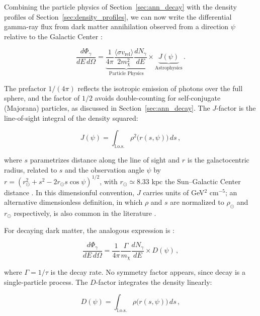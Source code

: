 Combining the particle physics of Section~\ref{sec:ann_decay} with the density profiles of Section~\ref{sec:density_profiles}, we can now write the differential gamma-ray flux from dark matter annihilation observed from a direction $\psi$ relative to the Galactic Center \cite{Cirelli:2024ssz,Hooper:2024}:

\begin{equation}
	\frac{d\Phi_\gamma}{dE\, d\Omega} = \underbrace{\frac{1}{4\pi} \frac{\langle \sigma v_\text{rel} \rangle}{2 m_\chi^2} \frac{dN_\gamma}{dE}}_{\text{Particle Physics}} \times \underbrace{J(\psi)}_{\text{Astrophysics}} \,.
	\label{eq:flux_ann}
\end{equation}

The prefactor $1/(4\pi)$ reflects the isotropic emission of photons over the full sphere, and the factor of $1/2$ avoids double-counting for self-conjugate (Majorana) particles, as discussed in Section~\ref{sec:ann_decay}.
The $J$-factor is the line-of-sight integral of the density squared:

\begin{equation}
	J(\psi) = \int_\text{l.o.s.} \rho^2\bigl(r(s, \psi)\bigr) \, ds \,,
	\label{eq:jfactor}
\end{equation}

where $s$ parametrizes distance along the line of sight and $r$ is the galactocentric radius, related to $s$ and the observation angle $\psi$ by $r = (r_\odot^2 + s^2 - 2 r_\odot s \cos\psi)^{1/2}$, with $r_\odot \simeq 8.33$ kpc the Sun--Galactic Center distance \cite{Cirelli:2024ssz}.
In this dimensionful convention, $J$ carries units of GeV$^2$ cm$^{-5}$; an alternative dimensionless definition, in which $\rho$ and $s$ are normalized to $\rho_\odot$ and $r_\odot$ respectively, is also common in the literature \cite{Cirelli:2024ssz}.

For decaying dark matter, the analogous expression is \cite{Cirelli:2024ssz,Pinetti:2021jjs}:

\begin{equation}
	\frac{d\Phi_\gamma}{dE\, d\Omega} = \frac{1}{4\pi} \frac{\Gamma}{m_\chi} \frac{dN_\gamma}{dE} \times D(\psi) \,,
	\label{eq:flux_dec}
\end{equation}

where $\Gamma = 1/\tau$ is the decay rate.
No symmetry factor appears, since decay is a single-particle process.
The $D$-factor integrates the density linearly:

\begin{equation}
	D(\psi) = \int_\text{l.o.s.} \rho\bigl(r(s, \psi)\bigr) \, ds \,,
	\label{eq:dfactor}
\end{equation}

